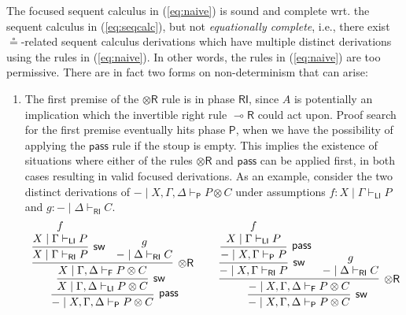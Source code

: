 \documentclass[copyright,creativecommons]{eptcs}
\theoremstyle{definition}
\newcommand{\tr}{\otimes \mathsf{R}}
\newcommand{\lright}{{\multimap}\mathsf{R}}
\newcommand{\pass}{\mathsf{pass}}
\newcommand{\ot}{\otimes}
\newcommand{\RI}{\mathsf{RI}}
\newcommand{\LI}{\mathsf{LI}}
\newcommand{\Pass}{\mathsf{P}}
\newcommand{\F}{\mathsf{F}}
\newcommand{\proofbox}[1]{\begin{tabular}{l} #1 \end{tabular}}
\begin{document}
The focused sequent calculus in (\ref{eq:naive}) is sound and complete wrt. the sequent calculus in (\ref{eq:seqcalc}), but not \emph{equationally complete}, i.e., there exist $\circeq$-related sequent calculus derivations which have multiple distinct derivations using the rules in (\ref{eq:naive}). In other words, the rules in (\ref{eq:naive}) are too permissive. There are in fact two forms on non-determinism that can arise:
\begin{enumerate}
\item The first premise of the $\tr$ rule is in phase $\RI$, since $A$ is potentially an implication which the invertible right rule $\lright$ could act upon. Proof search for the first premise eventually hits phase $\Pass$, when we have the possibility of applying the $\pass$ rule if the stoup is empty. This implies the existence of situations where either of the rules $\tr$ and $\pass$ can be applied first, in both cases resulting in valid focused derivations. 
  As an example, consider the two distinct derivations of ${-} \mid X , \Gamma , \Delta \vdash_{\Pass} P \ot C$ under assumptions $f : X \mid \Gamma \vdash_{\LI} P$ and $g : {-} \mid \Delta \vdash_{\RI} C$.
  \begin{equation}\label{eq:passtr}
    \proofbox{
      \infer[\pass]{{-} \mid X , \Gamma , \Delta \vdash_{\Pass} P \ot C}{
        \infer[\mathsf{sw}]{X \mid \Gamma , \Delta \vdash_{\LI} P \ot C}{
          \infer[\tr]{X \mid \Gamma , \Delta \vdash_{\F} P \ot C}{
            \infer[\mathsf{sw}]{X \mid \Gamma \vdash_{\RI} P}{
              \deduce{X \mid \Gamma \vdash_{\LI} P}{f}
            }
            &
            \deduce{{-} \mid \Delta \vdash_{\RI} C}{g}
          }
        }
      }
    \qquad
    \infer[\mathsf{sw}]{{-} \mid X , \Gamma , \Delta \vdash_{\Pass} P \ot C}{
      \infer[\tr]{{-} \mid X , \Gamma , \Delta \vdash_{\F} P \ot C}{
        \infer[\mathsf{sw}]{{-} \mid X , \Gamma \vdash_{\RI} P}{
          \infer[\pass]{{-} \mid X , \Gamma \vdash_{\Pass} P}{
            \deduce{X \mid \Gamma \vdash_{\LI} P}{f}
          }
        }
        &
        \deduce{{-} \mid \Delta \vdash_{\RI} C}{g}
      }
    }
    }
  \end{equation}

\end{enumerate}
\end{document}

